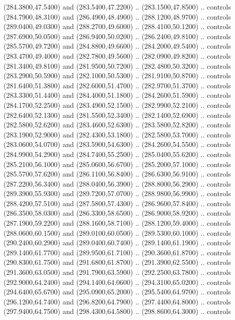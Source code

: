 {\begin{scope}[y=0.80pt, x=0.80pt, yscale=-1, xscale=1, inner sep=0pt, outer sep=0pt, #1]
      (284.3800,47.5400) and (283.5400,47.2200) .. (283.1500,47.8500) .. controls
      (284.7900,48.3100) and (286.4900,48.4900) .. (288.1200,48.9700) .. controls
      (289.0400,49.0300) and (288.2700,49.6000) .. (288.4100,50.1200) .. controls
      (287.6900,50.0500) and (286.9400,50.0200) .. (286.2400,49.8100) .. controls
      (285.5700,49.7200) and (284.8800,49.6600) .. (284.2000,49.5400) .. controls
      (283.4700,49.4000) and (282.7800,49.5600) .. (282.0900,49.8200) .. controls
      (281.3400,49.8100) and (281.9500,50.7200) .. (282.4800,50.3200) .. controls
      (283.2900,50.5900) and (282.1000,50.5300) .. (281.9100,50.8700) .. controls
      (281.6400,51.3800) and (282.6000,51.4700) .. (282.9700,51.3700) .. controls
      (283.3300,51.4400) and (284.4000,51.1800) .. (284.2600,51.5900) .. controls
      (284.1700,52.2500) and (283.4900,52.1500) .. (282.9900,52.2100) .. controls
      (282.6400,52.1300) and (281.5500,52.3400) .. (282.1400,52.6900) .. controls
      (282.5800,52.6200) and (283.4600,52.6300) .. (283.5800,52.8200) .. controls
      (283.1900,52.9000) and (282.4300,53.1800) .. (282.5800,53.7000) .. controls
      (283.0600,54.0700) and (283.5900,54.6300) .. (284.2600,54.5500) .. controls
      (284.9900,54.2900) and (284.7400,55.2500) .. (285.0400,55.6200) .. controls
      (285.2100,56.1000) and (285.0600,56.6700) .. (285.2000,57.1000) .. controls
      (285.5700,57.6200) and (286.1100,56.8400) .. (286.6300,56.9100) .. controls
      (287.2200,56.3400) and (288.0400,56.3900) .. (288.8000,56.2900) .. controls
      (289.3900,55.9300) and (289.7200,57.0700) .. (288.9800,56.9900) .. controls
      (288.4200,57.5100) and (287.5800,57.4300) .. (286.9600,57.8400) .. controls
      (286.3500,58.0300) and (286.3300,58.6500) .. (286.9000,58.9200) .. controls
      (287.1900,59.2200) and (288.1600,58.7100) .. (288.1200,59.4000) .. controls
      (288.0600,60.1500) and (289.0100,60.0500) .. (289.5300,60.1000) .. controls
      (290.2400,60.2900) and (289.0400,60.7400) .. (289.1400,61.1900) .. controls
      (289.1400,61.7700) and (289.9500,61.7100) .. (290.3600,61.8700) .. controls
      (290.8300,61.7500) and (291.6800,61.8700) .. (291.3900,62.5500) .. controls
      (291.3600,63.0500) and (291.7900,63.5900) .. (292.2500,63.7800) .. controls
      (292.9000,64.2400) and (294.1400,64.0600) .. (294.3100,65.0200) .. controls
      (294.6400,65.6700) and (295.0900,65.2000) .. (295.5400,64.9700) .. controls
      (296.1200,64.7400) and (296.8200,64.7900) .. (297.4400,64.8000) .. controls
      (297.9400,64.7500) and (298.4300,64.5800) .. (298.8600,64.3000) .. controls

\end{scope}}
